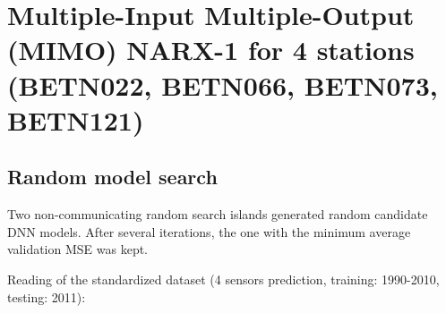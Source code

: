 \documentclass[11pt]{article}
\begin{document}
    \hypertarget{multiple-input-multiple-output-mimo-narx-1-for-4-stations-betn022-betn066-betn073-betn121}{%
\section{Multiple-Input Multiple-Output (MIMO) NARX-1 for 4 stations
(BETN022, BETN066, BETN073,
BETN121)}\label{multiple-input-multiple-output-mimo-narx-1-for-4-stations-betn022-betn066-betn073-betn121}}

    \hypertarget{random-model-search}{%
\subsection{Random model search}\label{random-model-search}}

    Two non-communicating random search islands generated random candidate
DNN models. After several iterations, the one with the minimum average
validation MSE was kept.

Reading of the standardized dataset (4 sensors prediction, training:
1990-2010, testing: 2011):
\end{document}
